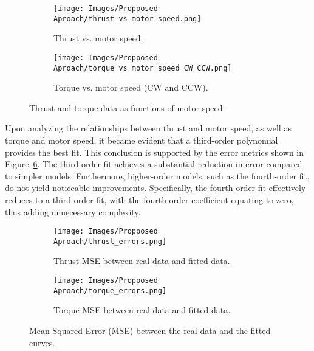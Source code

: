 \begin{figure}[H]
    \begin{subfigure}{0.5\textwidth}
        \centering
        \texttt{[image: Images/Propposed Aproach/thrust\_vs\_motor\_speed.png]}
        \caption{Thrust vs. motor speed.}
        \label{fig:proposed_approach_simulation_motor_data_thrust}
    \end{subfigure}
    \hfill
    \begin{subfigure}{0.5\textwidth}
        \centering
        \texttt{[image: Images/Propposed Aproach/torque\_vs\_motor\_speed\_CW\_CCW.png]}
        \caption{Torque vs. motor speed (CW and CCW).}
        \label{fig:proposed_approach_simulation_motor_data_torque}
    \end{subfigure}
    \caption{Thrust and torque data as functions of motor speed.}
    \label{fig:Proposed Approach:Simulation:MotorData}
\end{figure}

Upon analyzing the relationships between thrust and motor speed, as well as torque and motor speed, it became evident that a third-order polynomial provides the best fit. This conclusion is supported by the error metrics shown in Figure~\ref{fig:Proposed Approach:Simulation:FittingErrors}. The third-order fit achieves a substantial reduction in error compared to simpler models. Furthermore, higher-order models, such as the fourth-order fit, do not yield noticeable improvements. Specifically, the fourth-order fit effectively reduces to a third-order fit, with the fourth-order coefficient equating to zero, thus adding unnecessary complexity.

\begin{figure}[H]
    \begin{subfigure}{0.5\textwidth} 
        \centering
        \texttt{[image: Images/Propposed Aproach/thrust\_errors.png]}
        \caption{Thrust MSE between real data and fitted data.}
        \label{fig:Proposed Approach:Simulation:ThrustErrors}
    \end{subfigure} 
    \hfill
    \begin{subfigure}{0.5\textwidth}
        \centering
        \texttt{[image: Images/Propposed Aproach/torque\_errors.png]}
        \caption{Torque MSE between real data and fitted data.}
        \label{fig:Proposed Approach:Simulation:TorqueErrors}
    \end{subfigure}
    \caption{Mean Squared Error (MSE) between the real data and the fitted curves.}
    \label{fig:Proposed Approach:Simulation:FittingErrors}
\end{figure}
